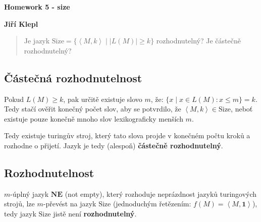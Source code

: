 \documentclass[a4paper,12pt]{article} %
\begin{document}
\thispagestyle{empty} %

\begin{center}
    {\Large \bf Homework 5 - size}
    \vspace{2mm}

    {\bf Jiří Klepl}

\end{center}

\vspace{0.4cm}


\begin{quote}
    Je jazyk $\text{Size} = \{\left<M,k\right> \mid \left\vert L(M) \right\vert \geq k\}$ rozhodnutelný? Je částečně rozhodnutelný?
\end{quote}

\subsection*{Částečná rozhodnutelnost}

Pokud $L(M) \geq k$, pak určitě existuje slovo $m$, že: $\{x \mid x \in L(M): x \leq m\} = k$. Tedy stačí ověřit konečný počet slov, aby se potvrdilo, že $\left<M, k\right> \in \text{Size}$, neboť existuje pouze konečně mnoho slov lexikograficky menších $m$.

Tedy existuje turingův stroj, který tato slova projde v konečném počtu kroků a rozhodne o přijetí. Jazyk je tedy (alespoň) \textbf{částečně rozhodnutelný}.

\subsection*{Rozhodnutelnost}

$m$-úplný jazyk $\textbf{NE}$ (not empty), který rozhoduje neprázdnost jazyků turingových strojů, lze $m$-převést na jazyk $\text{Size}$ (jednoduchým řetězením: $f(M) = \left<M , \mathbf{1} \right>$), tedy jazyk $\text{Size}$ jistě není \textbf{rozhodnutelný}.
\end{document}
